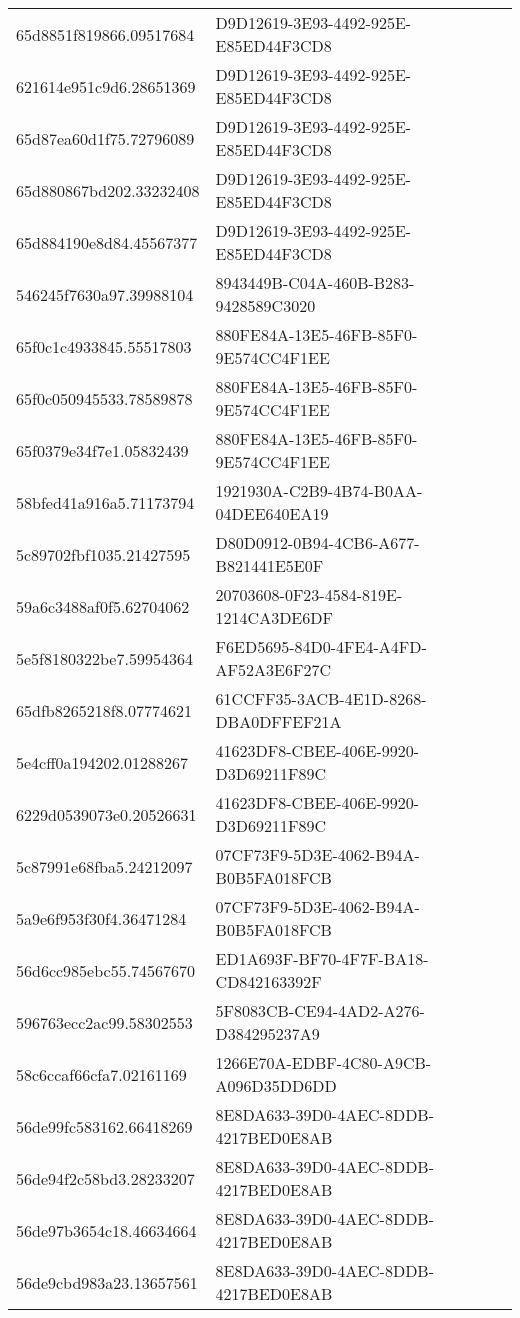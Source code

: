 \begin{tabular}{ll}
65d8851f819866.09517684 & D9D12619-3E93-4492-925E-E85ED44F3CD8 \\
621614e951c9d6.28651369 & D9D12619-3E93-4492-925E-E85ED44F3CD8 \\
65d87ea60d1f75.72796089 & D9D12619-3E93-4492-925E-E85ED44F3CD8 \\
65d880867bd202.33232408 & D9D12619-3E93-4492-925E-E85ED44F3CD8 \\
65d884190e8d84.45567377 & D9D12619-3E93-4492-925E-E85ED44F3CD8 \\
546245f7630a97.39988104 & 8943449B-C04A-460B-B283-9428589C3020 \\
65f0c1c4933845.55517803 & 880FE84A-13E5-46FB-85F0-9E574CC4F1EE \\
65f0c050945533.78589878 & 880FE84A-13E5-46FB-85F0-9E574CC4F1EE \\
65f0379e34f7e1.05832439 & 880FE84A-13E5-46FB-85F0-9E574CC4F1EE \\
58bfed41a916a5.71173794 & 1921930A-C2B9-4B74-B0AA-04DEE640EA19 \\
5c89702fbf1035.21427595 & D80D0912-0B94-4CB6-A677-B821441E5E0F \\
59a6c3488af0f5.62704062 & 20703608-0F23-4584-819E-1214CA3DE6DF \\
5e5f8180322be7.59954364 & F6ED5695-84D0-4FE4-A4FD-AF52A3E6F27C \\
65dfb8265218f8.07774621 & 61CCFF35-3ACB-4E1D-8268-DBA0DFFEF21A \\
5e4cff0a194202.01288267 & 41623DF8-CBEE-406E-9920-D3D69211F89C \\
6229d0539073e0.20526631 & 41623DF8-CBEE-406E-9920-D3D69211F89C \\
5c87991e68fba5.24212097 & 07CF73F9-5D3E-4062-B94A-B0B5FA018FCB \\
5a9e6f953f30f4.36471284 & 07CF73F9-5D3E-4062-B94A-B0B5FA018FCB \\
56d6cc985ebc55.74567670 & ED1A693F-BF70-4F7F-BA18-CD842163392F \\
596763ecc2ac99.58302553 & 5F8083CB-CE94-4AD2-A276-D384295237A9 \\
58c6ccaf66cfa7.02161169 & 1266E70A-EDBF-4C80-A9CB-A096D35DD6DD \\
56de99fc583162.66418269 & 8E8DA633-39D0-4AEC-8DDB-4217BED0E8AB \\
56de94f2c58bd3.28233207 & 8E8DA633-39D0-4AEC-8DDB-4217BED0E8AB \\
56de97b3654c18.46634664 & 8E8DA633-39D0-4AEC-8DDB-4217BED0E8AB \\
56de9cbd983a23.13657561 & 8E8DA633-39D0-4AEC-8DDB-4217BED0E8AB \\

\end{tabular}
